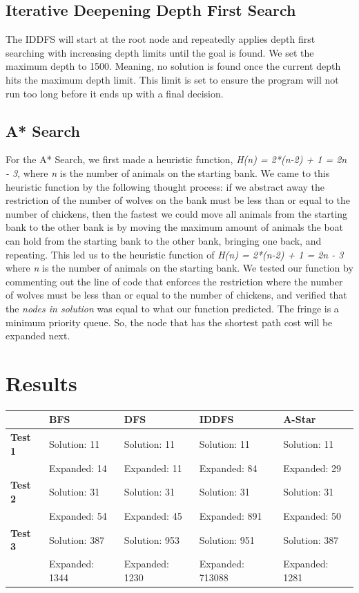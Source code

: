 \documentclass[onecolumn,draftclsnofoot, 10pt, compsoc]{IEEEtran}
\begin{document}
	
    \subsection{Iterative Deepening Depth First Search}
    The IDDFS will start at the root node and repeatedly applies depth first searching with increasing depth limits until the goal is found. We set the maximum depth to 1500. Meaning, no solution is found once the current depth hits the maximum depth limit. This limit is set to ensure the program will not run too long before it ends up with a final decision.



	\subsection{A* Search}
	For the A* Search, we first made a heuristic function, \textit{H(n) = 2*(n-2) + 1 = 2n - 3}, where \textit{n} is the number of animals on the starting bank. We came to this heuristic function by the following thought process: if we abstract away the restriction of the number of wolves on the bank must be less than or equal to the number of chickens, then the fastest we could move all animals from the starting bank to the other bank is by moving the maximum amount of animals the boat can hold from the starting bank to the other bank, bringing one back, and repeating. This led us to the heuristic function of \textit{H(n) = 2*(n-2) + 1 = 2n - 3} where \textit{n} is the number of animals on the starting bank.
	We tested our function by commenting out the line of code that enforces the restriction where the number of wolves must be less than or equal to the number of chickens, and verified that the \textit{nodes in solution} was equal to what our function predicted.
	The fringe is a minimum priority queue. So, the node that has the shortest path cost will be expanded next.
	
	
	
	\section{Results}
	\begin{center}
    \begin{tabular}{|l|l|l|l|l|}
        \hline
        & \textbf{BFS} & \textbf{DFS} & \textbf{IDDFS} & \textbf{A-Star} \\ \hline
        \textbf{Test 1} & Solution: 11 & Solution: 11 & Solution: 11 & Solution: 11 \\
        & Expanded: 14 & Expanded: 11 & Expanded: 84 & Expanded: 29 \\ \hline
        \textbf{Test 2} & Solution: 31 & Solution: 31 & Solution: 31 & Solution: 31 \\
        & Expanded: 54 & Expanded: 45 & Expanded: 891 & Expanded: 50 \\ \hline
        \textbf{Test 3} & Solution: 387 & Solution: 953 & Solution: 951 & Solution: 387 \\
        & Expanded: 1344 & Expanded: 1230 & Expanded: 713088 & Expanded: 1281 \\ \hline
    \end{tabular}
\end{center}
	
\end{document}
